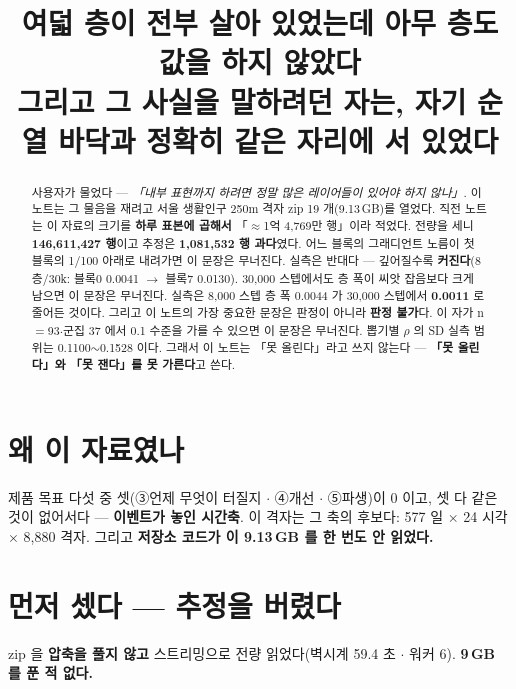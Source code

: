 \documentclass{article}
\title{여덟 층이 전부 살아 있었는데 아무 층도 값을 하지 않았다 \\
  {\large 그리고 그 사실을 말하려던 자는, 자기 순열 바닥과 정확히 같은 자리에 서 있었다}}
\begin{document}
\maketitle

\begin{abstract}
사용자가 물었다 --- \textit{「내부 표현까지 하려면 정말 많은 레이어들이 있어야 하지 않나」}.
이 노트는 그 물음을 재려고 서울 생활인구 250m 격자 zip 19 개(9.13\,GB)를 열었다.
직전 노트는 이 자료의 크기를 \textbf{하루 표본에 곱해서} 「$\approx$1억 4,769만 행」이라 적었다.
전량을 세니 \textbf{146{,}611{,}427 행}이고 추정은 \textbf{1{,}081{,}532 행 과다}였다.
{어느 블록의 그래디언트 노름이 첫 블록의 1/100 아래로 내려가면 이 문장은 무너진다.
실측은 반대다 --- 깊어질수록 \textbf{커진다}(8층/30k: 블록0 0.0041 $\to$ 블록7 0.0130).}
{30{,}000 스텝에서도 층 폭이 씨앗 잡음보다 크게 남으면 이 문장은 무너진다.
실측은 8{,}000 스텝 층 폭 0.0044 가 30{,}000 스텝에서 \textbf{0.0011} 로 줄어든 것이다.}
그리고 이 노트의 가장 중요한 문장은 판정이 아니라 \textbf{판정 불가}다.
{이 자가 n$=$93$\cdot$군집 37 에서 0.1 수준을 가를 수 있으면 이 문장은 무너진다.
뽑기별 $\rho$ 의 SD 실측 범위는 0.1100$\sim$0.1528 이다.}
그래서 이 노트는 「못 올린다」라고 쓰지 않는다 --- \textbf{「못 올린다」와 「못 잰다」를 못 가른다}고 쓴다.
\end{abstract}

\section{왜 이 자료였나}

제품 목표 다섯 중 셋(③언제 무엇이 터질지 $\cdot$ ④개선 $\cdot$ ⑤파생)이 0 이고,
셋 다 같은 것이 없어서다 --- \textbf{이벤트가 놓인 시간축}. 이 격자는 그 축의 후보다:
577 일 $\times$ 24 시각 $\times$ 8{,}880 격자.
그리고 \textbf{저장소 코드가 이 9.13\,GB 를 한 번도 안 읽었다.}

\section{먼저 셌다 --- 추정을 버렸다}

zip 을 \textbf{압축을 풀지 않고} 스트리밍으로 전량 읽었다(벽시계 59.4 초 $\cdot$ 워커 6).
\textbf{9\,GB 를 푼 적 없다.}
\end{document}
